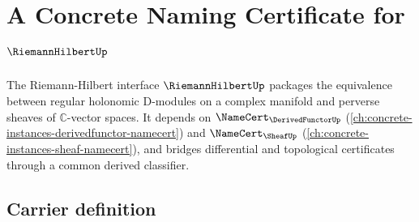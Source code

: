 \chapter{A Concrete Naming Certificate for $\RiemannHilbertUp$}
\label{ch:concrete-instances-riemannhilbert-namecert}

The Riemann-Hilbert interface $\RiemannHilbertUp$ packages the equivalence between regular holonomic D-modules on a complex manifold and perverse sheaves of $\mathbb{C}$-vector spaces. It depends on $\NameCert_{\DerivedFunctorUp}$ (\autoref{ch:concrete-instances-derivedfunctor-namecert}) and $\NameCert_{\SheafUp}$ (\autoref{ch:concrete-instances-sheaf-namecert}), and bridges differential and topological certificates through a common derived classifier.

\section{Carrier definition}
\label{sec:riemannhilbert-carrier}

